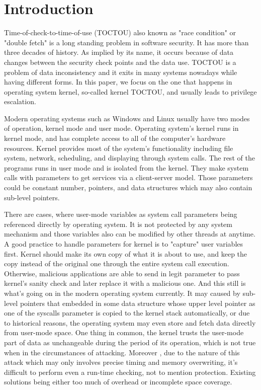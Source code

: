 
\section{Introduction}

Time-of-check-to-time-of-use (TOCTOU) also known as "race condition" or "double fetch" is a long standing problem in software security. It has more than three decades of history. As implied by its name, it occurs because of data changes between the security check points and the data use. TOCTOU is a problem of data inconsistency and it exits in many systems nowadays while having different forms. In this paper, we focus on the one that happens in operating system kernel, so-called kernel TOCTOU, and usually leads to privilege escalation.

Modern operating systems such as Windows and Linux usually have two modes of operation, kernel mode and user mode. Operating system's kernel runs in kernel mode, and has complete access to all of the computer's hardware resources. Kernel provides most of the system's functionality including file system, network, scheduling, and displaying through system calls. The rest of the programs runs in user mode and is isolated from the kernel. They make system calls with parameters to get services via a client-server model. Those parameters could be constant number, pointers, and data structures which may also contain sub-level pointers.

There are cases, where user-mode variables as system call parameters being referenced directly by operating system. It is not protected by any system mechanism and those variables also can be modified by other threads at anytime. A good practice to handle parameters for kernel is to "capture" user variables first. Kernel should make its own copy of what it is about to use, and keep the copy instead of the original one through the entire system call execution. Otherwise, malicious applications are able to send in legit parameter to pass kernel's sanity check and later replace it with a malicious one. And this still is what's going on in the modern operating system currently. It may caused by sub-level pointers that embedded in some data structure whose upper level pointer as one of the syscalls parameter is copied to the kernel stack automatically, or due to historical reasons, the operating system may even store and fetch data directly from user-mode space. One thing in common, the kernel trusts the user-mode part of data as unchangeable during the period of its operation, which is not true when in the circumstances of attacking. Moreover
, due to the nature of this attack which may only involves precise timing and memory overwriting, it's difficult to perform even a run-time checking, not to mention protection. Existing solutions being either too much of overhead or incomplete space coverage.

